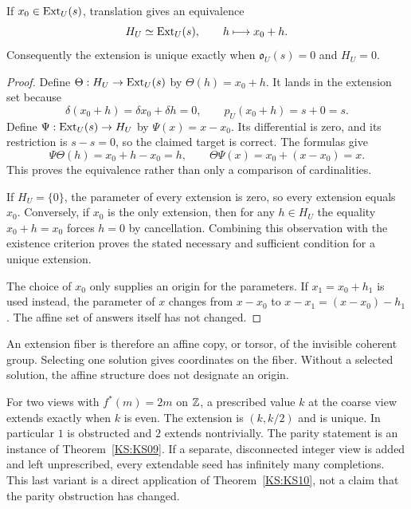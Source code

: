 \begin{KStheorem}\label{KS:KS10}
If \(x_0\in\operatorname{Ext}_U(s)\), translation gives an equivalence
\[
 H_U\simeq\operatorname{Ext}_U(s),\qquad h\longmapsto x_0+h.
\]
Consequently the extension is unique exactly when \(\mathfrak o_U(s)=0\) and \(H_U=0\).
\end{KStheorem}
\begin{proof}
Define $\Theta:H_U\to\operatorname{Ext}_U(s)$ by $\Theta(h)=x_0+h$. It lands in the extension set because
\[
 \delta(x_0+h)=\delta x_0+\delta h=0,
 \qquad p_U(x_0+h)=s+0=s.
\]
Define $\Psi:\operatorname{Ext}_U(s)\to H_U$ by $\Psi(x)=x-x_0$. Its differential is zero, and its restriction is $s-s=0$, so the claimed target is correct. The formulas give
\[
 \Psi\Theta(h)=x_0+h-x_0=h,\qquad
 \Theta\Psi(x)=x_0+(x-x_0)=x.
\]
This proves the equivalence rather than only a comparison of cardinalities.

If $H_U=\{0\}$, the parameter of every extension is zero, so every extension equals $x_0$. Conversely, if $x_0$ is the only extension, then for any $h\in H_U$ the equality $x_0+h=x_0$ forces $h=0$ by cancellation. Combining this observation with the existence criterion proves the stated necessary and sufficient condition for a unique extension.

The choice of $x_0$ only supplies an origin for the parameters. If $x_1=x_0+h_1$ is used instead, the parameter of $x$ changes from $x-x_0$ to $x-x_1=(x-x_0)-h_1$. The affine set of answers itself has not changed.
\end{proof}
An extension fiber is therefore an affine copy, or torsor, of the invisible coherent group. Selecting one solution gives coordinates on the fiber. Without a selected solution, the affine structure does not designate an origin.

\begin{KSexample}
For two views with \(f^*(m)=2m\) on \(\mathbb Z\), a prescribed value \(k\) at the coarse view extends exactly when \(k\) is even. The extension is \((k,k/2)\) and is unique. In particular \(1\) is obstructed and \(2\) extends nontrivially. The parity statement is an instance of Theorem~\ref{KS:KS09}. If a separate, disconnected integer view is added and left unprescribed, every extendable seed has infinitely many completions. This last variant is a direct application of Theorem~\ref{KS:KS10}, not a claim that the parity obstruction has changed.
\end{KSexample}

